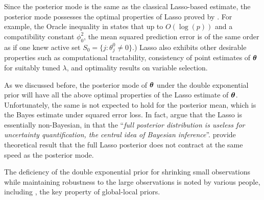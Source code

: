 \documentclass[11pt]{article}
\numberwithin{equation}{section}
\begin{document}
Since the posterior mode is the same as the classical Lasso-based estimate, the posterior mode possesses the optimal properties of Lasso proved by \cite{buhlmann2011statistics}. For example, the Oracle inequality in \citet[Eq. (2.8), Th. (6.1)]{buhlmann2011statistics} states that up to $O(\log(p))$ and a compatibility constant $\phi_0^2$, the mean squared prediction error is of the same order as if one knew active set $S_0 = \{j : \theta_j^0 \neq 0 \}$.)  Lasso also exhibits other desirable properties such as computational tractability, consistency of point estimates of $\boldsymbol{\theta}$ for suitably tuned $\lambda$, and optimality results on variable selection. 

As we discussed before, the posterior mode of $\boldsymbol{\theta}$ under the double exponential prior will have all the above optimal properties of the Lasso estimate of $\boldsymbol{\theta}$. Unfortunately, the same is not expected to hold for the posterior mean, which is the Bayes estimate under squared error loss. In fact, \citet{castillo2015bayesian} argue that the Lasso is essentially non-Bayesian, in that the ``\textsl{full posterior distribution is useless for uncertainty quantification, the central idea of Bayesian inference}''. \citet{castillo2015bayesian} provide theoretical result that the full Lasso posterior does not contract at the same speed as the posterior mode. 

The deficiency of the double exponential prior for shrinking small observations while maintaining robustness to the large observations is noted by various people, including \cite{polson2010shrink,datta2013asymptotic}, the key property of global-local priors. 

\end{document}

